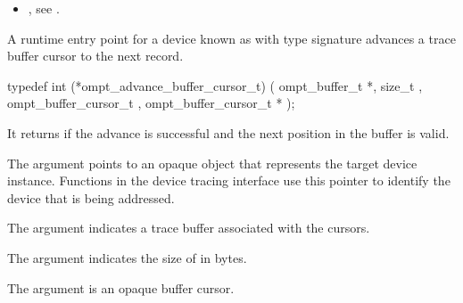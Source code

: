 
\crossreferences
\begin{itemize}
\item {},
see .
\end{itemize}

\label{sec:ompt_advance_buffer_cursor_t}


\summary
A runtime entry point for a device known as 
with type signature 
advances a trace buffer cursor to the next record.

\format
\begin{ccppspecific}
\begin{omptInquiry}
typedef int (*ompt_advance_buffer_cursor_t) (
  ompt_buffer_t *,
  size_t ,
  ompt_buffer_cursor_t ,
  ompt_buffer_cursor_t *
);
\end{omptInquiry}
\end{ccppspecific}

\descr
It returns  if the advance is successful and the next
position in the buffer is valid.

\argdesc
The  argument points to an opaque object that represents
the target device instance. Functions in the device tracing interface
use this pointer to identify the device that is being addressed.

The argument  indicates a trace buffer associated
with the cursors.

The argument  indicates the size of  in
bytes.

The argument  is an opaque buffer cursor.

